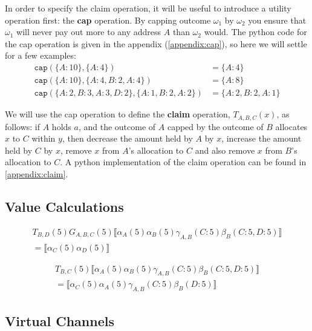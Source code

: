 \documentclass{article}
\theoremstyle{definition}
\newcommand{\adj}[1]{\llbracket #1 \rrbracket}
\begin{document}
In order to specify the claim operation, it will be useful to introduce a utility operation first: the \textbf{cap} operation.
By capping outcome $\omega_1$ by $\omega_2$ you ensure that $\omega_1$ will never pay out more to any address $A$ than $\omega_2$ would.
The python code for the cap operation is given in the appendix (\ref{appendix:cap}), so here we will settle for a few examples:
\begin{align*}
  \texttt{cap}(\{A: 10\}, \{A:4\}) &= \{A: 4 \} \\
  \texttt{cap}(\{A: 10\}, \{A:4, B: 2, A: 4\}) &= \{A: 8 \} \\
  \texttt{cap}(\{A: 2, B: 3, A: 3, D: 2\}, \{A: 1, B: 2, A: 2\}) &= \{A: 2, B: 2, A:1\}
\end{align*}

We will use the cap operation to define the \textbf{claim} operation, $T_{A,B,C}(x)$, as follows: if $A$ holds $a$, and the outcome of $A$ capped by the outcome of $B$ allocates $x$ to $C$ within $y$, then decrease the amount held by $A$ by $x$, increase the amount held by $C$ by $x$, remove $x$ from $A$'s allocation to $C$ and also remove $x$ from $B$'s allocation to $C$. A python implementation of the claim operation can be found in \ref{appendix:claim}.

\subsection{Value Calculations}

\begin{multline*}
  T_{B, D}(5)G_{A, B, C}(5)\adj{\alpha_A(5)\alpha_B(5)\gamma_{A, B}(C: 5)\beta_B(C: 5, D: 5)}\\= \adj{\alpha_C(5)\alpha_D(5)}
\end{multline*}

\begin{multline*}
  T_{B, C}(5)\adj{\alpha_A(5)\alpha_B(5)\gamma_{A, B}(C: 5)\beta_B(C: 5, D: 5)} \\= \adj{\alpha_C(5)\alpha_A(5)\gamma_{A, B}(C: 5)\beta_B(D: 5)}
\end{multline*}

\subsection{Virtual Channels}
\end{document}
